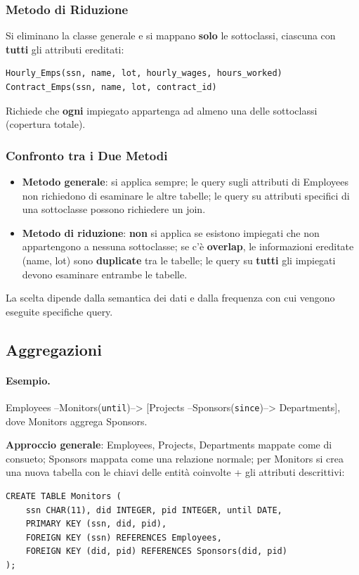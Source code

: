\documentclass[12pt, a4paper]{article}
\begin{document}
\subsubsection{Metodo di Riduzione}
Si eliminano la classe generale e si mappano \textbf{solo} le sottoclassi, ciascuna con \textbf{tutti} gli attributi ereditati:
\begin{verbatim}
Hourly_Emps(ssn, name, lot, hourly_wages, hours_worked)
Contract_Emps(ssn, name, lot, contract_id)
\end{verbatim}
Richiede che \textbf{ogni} impiegato appartenga ad almeno una delle sottoclassi (copertura totale).

\subsubsection{Confronto tra i Due Metodi}
\begin{itemize}
    \item \textbf{Metodo generale}: si applica sempre; le query sugli attributi di Employees non richiedono di esaminare le altre tabelle; le query su attributi specifici di una sottoclasse possono richiedere un join.
    \item \textbf{Metodo di riduzione}: \textbf{non} si applica se esistono impiegati che non appartengono a nessuna sottoclasse; se c'è \textbf{overlap}, le informazioni ereditate (name, lot) sono \textbf{duplicate} tra le tabelle; le query su \textbf{tutti} gli impiegati devono esaminare entrambe le tabelle.
\end{itemize}
La scelta dipende dalla semantica dei dati e dalla frequenza con cui vengono eseguite specifiche query.

\subsection{Aggregazioni}

\paragraph{Esempio.} Employees --Monitors(\texttt{until})--> [Projects --Sponsors(\texttt{since})--> Departments], dove Monitors aggrega Sponsors.

\textbf{Approccio generale}: Employees, Projects, Departments mappate come di consueto; Sponsors mappata come una relazione normale; per Monitors si crea una nuova tabella con le chiavi delle entità coinvolte + gli attributi descrittivi:
\begin{verbatim}
CREATE TABLE Monitors (
    ssn CHAR(11), did INTEGER, pid INTEGER, until DATE,
    PRIMARY KEY (ssn, did, pid),
    FOREIGN KEY (ssn) REFERENCES Employees,
    FOREIGN KEY (did, pid) REFERENCES Sponsors(did, pid)
);
\end{verbatim}
\end{document}
